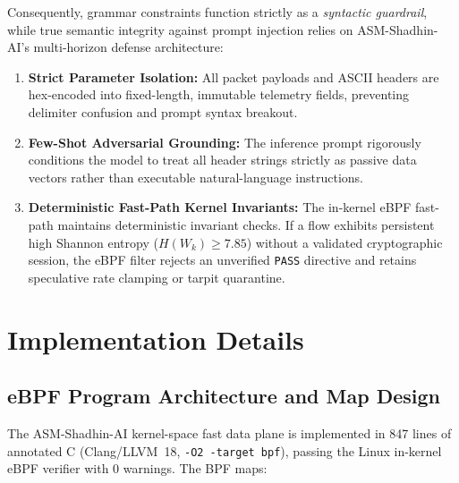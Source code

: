 \documentclass{ieeeaccess}
\renewcommand{\_}{\textunderscore\allowbreak}
\begin{document}
Consequently, grammar constraints function strictly as a \textit{syntactic guardrail}, while true semantic
integrity against prompt injection relies on ASM-Shadhin-AI's multi-horizon defense architecture:
\begin{enumerate}
  \item \textbf{Strict Parameter Isolation:} All packet payloads and ASCII headers are hex-encoded into fixed-length, immutable telemetry fields, preventing delimiter confusion and prompt syntax breakout.
  \item \textbf{Few-Shot Adversarial Grounding:} The inference prompt rigorously conditions the model to treat all header strings strictly as passive data vectors rather than executable natural-language instructions.
  \item \textbf{Deterministic Fast-Path Kernel Invariants:} The in-kernel eBPF fast-path maintains deterministic invariant checks. If a flow exhibits persistent high Shannon entropy ($H(W_k) \ge 7.85$) without a validated cryptographic session, the eBPF filter rejects an unverified \texttt{PASS} directive and retains speculative rate clamping or tarpit quarantine.
\end{enumerate}

\section{Implementation Details}
\subsection{eBPF Program Architecture and Map Design}
The ASM-Shadhin-AI kernel-space fast data plane is implemented in 847 lines of
annotated C (Clang/LLVM~18, \texttt{-O2 -target bpf}), passing the Linux
in-kernel eBPF verifier with 0 warnings. The BPF maps:
\end{document}
